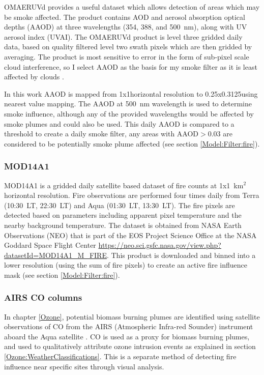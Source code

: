       
      OMAERUVd provides a useful dataset which allows detection of areas which may be smoke affected.
      The product contains AOD and aerosol absorption optical depths (AAOD) at three wavelengths (354, 388, and 500~nm), along with UV aerosol index (UVAI).
      The OMAERUVd product is level three gridded daily data, based on quality filtered level two swath pixels which are then gridded by averaging.
      The product is most sensitive to error in the form of sub-pixel scale cloud interference, so I select AAOD as the basis for my smoke filter as it is least affected by clouds \parencite{Ahn2008}.
      
      In this work AAOD is mapped from 1x1\degr horizontal resolution to 0.25x0.3125\degr using nearest value mapping.
      The AAOD at 500~nm wavelength is used to determine smoke influence, although any of the provided wavelengths would be affected by smoke plumes and could also be used.
      This daily AAOD is compared to a threshold to create a daily smoke filter, any areas with AAOD$>0.03$ are considered to be potentially smoke plume affected (see section \ref{Model:Filter:fire}).
    
    \subsubsection{MOD14A1}
      \label{Model:Datasets:MOD14A1}
      MOD14A1 is a gridded daily satellite based dataset of fire counts at 1x1~km$^2$ horizontal resolution.
      Fire observations are performed four times daily from Terra (10:30~LT, 22:30~LT) and Aqua (01:30~LT, 13:30~LT).
      The fire pixels are detected based on parameters including apparent pixel temperature and the nearby background temperature.
      The dataset is obtained from NASA Earth Observations (NEO) that is part of the EOS Project Science Office at the NASA Goddard Space Flight Center \url{https://neo.sci.gsfc.nasa.gov/view.php?datasetId=MOD14A1_M_FIRE}.
      This product is downloaded and binned into a lower resolution (using the sum of fire pixels) to create an active fire influence mask (see section \ref{Model:Filter:fire}).
      
    \subsubsection{AIRS CO columns}
      \label{Model:Datasets:AIRS}
      
      In chapter \ref{Ozone}, potential biomass burning plumes are identified using satellite observations of CO from the AIRS (Atmospheric Infra-red Sounder) instrument aboard the Aqua satellite \parencite{AIRS3STD}.
      CO is used as a proxy for biomass burning plumes, and used to qualitatively attribute ozone intrusion events as explained in section \ref{Ozone:WeatherClassifications}.
      This is a separate method of detecting fire influence near specific sites through visual analysis.
      
